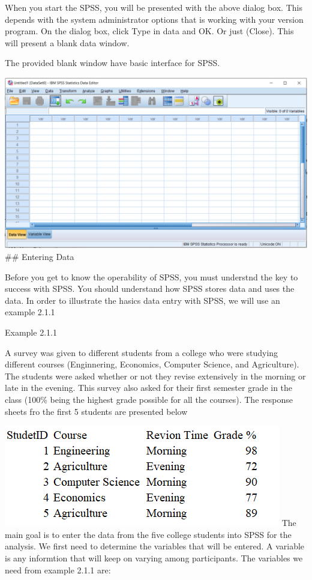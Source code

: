 \documentclass[
]{book}
\begin{document}
When you start the SPSS, you will be presented with the above dialog box. This depends with the system administrator options that is working with your version program. On the dialog box, click Type in data and OK. Or just (Close). This will present a blank data window.

The provided blank window have basic interface for SPSS.

\includegraphics{blankwindow.png}
\#\# Entering Data

Before you get to know the operability of SPSS, you must understnd the key to success with SPSS. You should understand how SPSS stores data and uses the data. In order to illustrate the hasics data entry with SPSS, we will use an example 2.1.1

Example 2.1.1

A survey was given to different students from a college who were studying different courses (Enginnering, Economics, Computer Science, and Agriculture). The students were asked whether or not they revise extensively in the morning or late in the evening. This survey also asked for their first semester grade in the class (100\% being the highest grade possible for all the courses). The response sheets fro the first 5 students are presented below

\includegraphics{Exampe211.png}
The main goal is to enter the data from the five college students into SPSS for the analysis. We first need to determine the variables that will be entered. A variable is any informtion that will keep on varying among participants. The variables we need from example 2.1.1 are:
\end{document}
